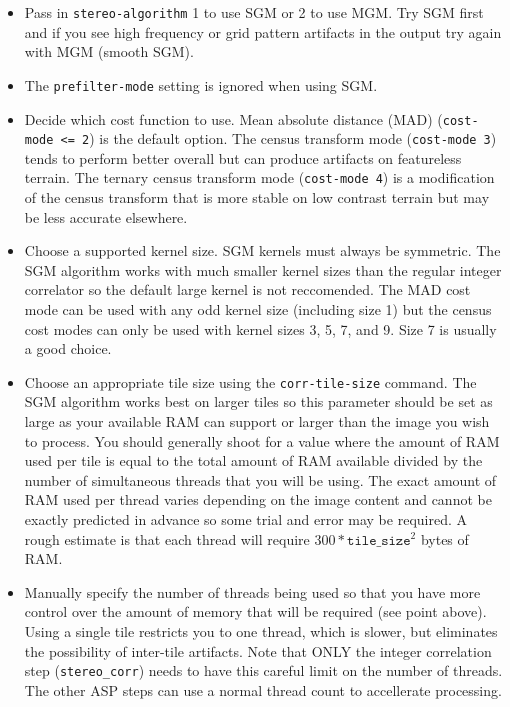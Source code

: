\begin{itemize}
\item Pass in \texttt{stereo-algorithm} 1 to use SGM or 2 to use MGM.  Try SGM first and if 
you see high frequency or grid pattern artifacts in the output try again with MGM (smooth SGM).
\item The \texttt{prefilter-mode} setting is ignored when using SGM.
\item Decide which cost function to use.  Mean absolute distance (MAD) 
(\texttt{cost-mode <= 2}) is the default option.  
The census transform mode (\texttt{cost-mode 3}) \citep{zabih1994census} tends to 
perform better overall but can produce artifacts on featureless terrain.  
The ternary census transform mode (\texttt{cost-mode 4}) \citep{hua2016texture} 
is a modification of the census transform that is more stable on low contrast terrain
but may be less accurate elsewhere.
\item Choose a supported kernel size.  SGM kernels must always be symmetric.
The SGM algorithm works with much smaller kernel sizes than the regular integer 
correlator so the default large kernel is not reccomended.
The MAD cost mode can be used with any odd kernel size (including size 1) but the census 
cost modes can only be used with kernel sizes 3, 5, 7, and 9.  Size 7 is usually a good choice.
\item Choose an appropriate tile size using the \texttt{corr-tile-size} command. The SGM
algorithm works best on larger tiles so this parameter should be set as large as your
available RAM can support or larger than the image you wish to process.  
You should generally shoot for a value where the amount of
RAM used per tile is equal to the total amount of RAM available divided by the number of
simultaneous threads that you will be using.  The exact amount of RAM used per thread 
varies depending on the image content and cannot be exactly predicted in advance so some
trial and error may be required.  A rough estimate is that each thread will require
$300*\texttt{tile\_size}^2$ bytes of RAM.
\item Manually specify the number of threads being used so that you have more control
over the amount of memory that will be required (see point above).  Using a single tile
restricts you to one thread, which is slower, but eliminates the possibility of inter-tile 
artifacts.  Note that ONLY the integer correlation step (\texttt{stereo\_corr}) needs to 
have this careful limit on the number of threads.  The other ASP steps can use a normal 
thread count to accellerate processing.

\end{itemize}
